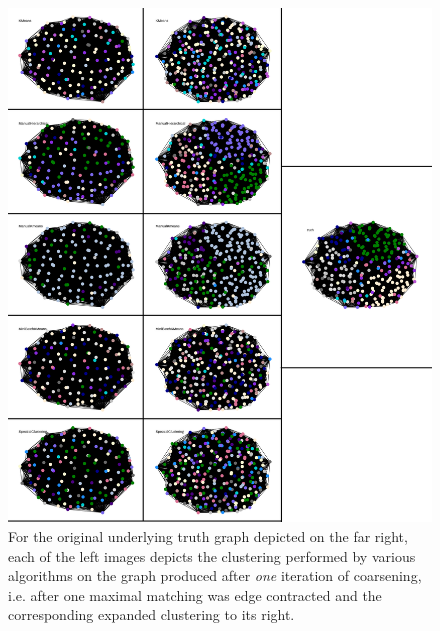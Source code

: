\documentclass{article}
\begin{document}
\begin{figure}[H]
    \centering
    \includegraphics[width=1.0\textwidth]{results/results_contracted-1.png}
    \caption[Coarsened clustering for one iteration on $p=0.90,q=0.15$]{For the original underlying truth graph depicted on the far right, each of the left images depicts the clustering performed by various algorithms on the graph produced after \textit{one} iteration of coarsening, i.e. after one maximal matching was edge contracted and the corresponding expanded clustering to its right.}
    \label{fig:results_contracted-1}
\end{figure}
\end{document}

